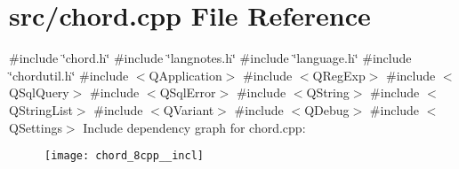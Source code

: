 \section{src/chord.cpp File Reference}
\label{chord_8cpp}
{\ttfamily \#include \char`\"{}chord.\+h\char`\"{}}\newline
{\ttfamily \#include \char`\"{}langnotes.\+h\char`\"{}}\newline
{\ttfamily \#include \char`\"{}language.\+h\char`\"{}}\newline
{\ttfamily \#include \char`\"{}chordutil.\+h\char`\"{}}\newline
{\ttfamily \#include $<$Q\+Application$>$}\newline
{\ttfamily \#include $<$Q\+Reg\+Exp$>$}\newline
{\ttfamily \#include $<$Q\+Sql\+Query$>$}\newline
{\ttfamily \#include $<$Q\+Sql\+Error$>$}\newline
{\ttfamily \#include $<$Q\+String$>$}\newline
{\ttfamily \#include $<$Q\+String\+List$>$}\newline
{\ttfamily \#include $<$Q\+Variant$>$}\newline
{\ttfamily \#include $<$Q\+Debug$>$}\newline
{\ttfamily \#include $<$Q\+Settings$>$}\newline
Include dependency graph for chord.\+cpp\+:\nopagebreak
\begin{figure}[H]
\begin{center}
\leavevmode
\texttt{[image: chord\_8cpp\_\_incl]}
\end{center}
\end{figure}
